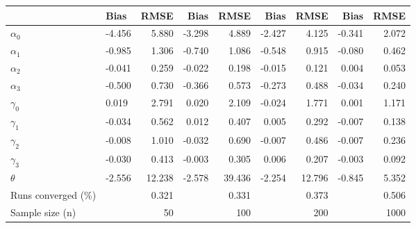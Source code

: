 
\begin{tabular}[t]{llrrrrrrr}
\toprule
  & Bias & RMSE & Bias & RMSE & Bias & RMSE & Bias & RMSE\\
\midrule
$\alpha_{0}$ & -4.456 & 5.880 & -3.298 & 4.889 & -2.427 & 4.125 & -0.341 & 2.072\\
$\alpha_{1}$ & -0.985 & 1.306 & -0.740 & 1.086 & -0.548 & 0.915 & -0.080 & 0.462\\
$\alpha_{2}$ & -0.041 & 0.259 & -0.022 & 0.198 & -0.015 & 0.121 & 0.004 & 0.053\\
$\alpha_{3}$ & -0.500 & 0.730 & -0.366 & 0.573 & -0.273 & 0.488 & -0.034 & 0.240\\
$\gamma_{0}$ & 0.019 & 2.791 & 0.020 & 2.109 & -0.024 & 1.771 & 0.001 & 1.171\\
$\gamma_{1}$ & -0.034 & 0.562 & 0.012 & 0.407 & 0.005 & 0.292 & -0.007 & 0.138\\
$\gamma_{2}$ & -0.008 & 1.010 & -0.032 & 0.690 & -0.007 & 0.486 & -0.007 & 0.236\\
$\gamma_{3}$ & -0.030 & 0.413 & -0.003 & 0.305 & 0.006 & 0.207 & -0.003 & 0.092\\
$\theta$ & -2.556 & 12.238 & -2.578 & 39.436 & -2.254 & 12.796 & -0.845 & 5.352\\
Runs converged (\%) &  & 0.321 &  & 0.331 &  & 0.373 &  & 0.506\\
Sample size (n) &  & 50 &  & 100 &  & 200 &  & 1000\\
\bottomrule
\end{tabular}
